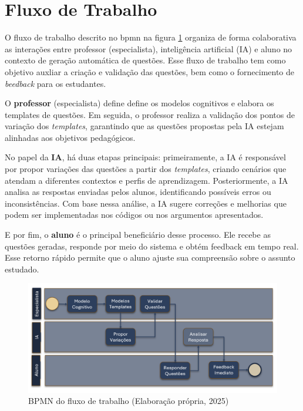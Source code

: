 \section{Fluxo de Trabalho}

O fluxo de trabalho descrito no \gls{bpmn} na figura \ref{fig:bpmn-fluxo} organiza de forma colaborativa as interações entre professor (especialista), inteligência artificial (IA) e aluno no contexto de geração automática de questões. Esse fluxo de trabalho tem como objetivo auxliar a criação e validação das questões, bem como o fornecimento de \textit{beedback} para os estudantes. 

O \textbf{professor} (especialista) define define os modelos cognitivos  e elabora os templates de questões. Em seguida, o professor realiza a validação dos pontos de variação dos \textit{templates}, garantindo que as questões propostas pela IA estejam alinhadas aos objetivos pedagógicos.

No papel da \textbf{IA}, há duas etapas principais: primeiramente, a IA é responsável por propor variações das questões a partir dos \textit{templates}, criando cenários  que atendam a diferentes contextos e perfis de aprendizagem. Posteriormente, a IA analisa as respostas enviadas pelos alunos, identificando possíveis erros ou inconsistências. Com base nessa análise, a IA sugere correções e melhorias que podem ser implementadas nos códigos ou nos argumentos apresentados.

E por fim, o \textbf{aluno} é o principal beneficiário desse processo. Ele recebe as questões geradas, responde por meio do sistema e obtém feedback em tempo real. Esse retorno rápido permite que o aluno ajuste sua compreensão sobre o assunto estudado. 

\begin{figure}[ht]
	\centering
	\includegraphics[width=16cm]{./imagens/capitulo6/bpmn-fluxo}
	\caption{BPMN do fluxo de trabalho (Elaboração própria, 2025) }
	\label{fig:bpmn-fluxo}
\end{figure}